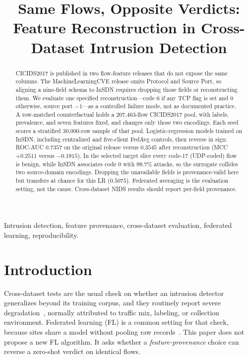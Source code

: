 \documentclass[conference,a4paper]{IEEEtran}
\begin{document}
\title{Same Flows, Opposite Verdicts: Feature Reconstruction in Cross-Dataset Intrusion Detection}
\author{
}
\maketitle
\begin{abstract}
CICIDS2017 is published in two flow-feature releases that do not expose the same columns. The MachineLearningCVE release omits Protocol and Source Port, so aligning a nine-field schema to InSDN requires dropping those fields or reconstructing them. We evaluate one specified reconstruction---code 6 if any TCP flag is set and 0 otherwise, source port $-1$---as a controlled failure mode, not as documented practice. A row-matched counterfactual holds a 207,463-flow CICIDS2017 pool, with labels, prevalence, and seven features fixed, and changes only those two encodings. Each seed scores a stratified 30,000-row sample of that pool. Logistic-regression models trained on InSDN, including centralized and five-client FedAvg controls, then reverse in sign: ROC-AUC $0.7357$ on the original release versus $0.3545$ after reconstruction (MCC $+0.2511$ versus $-0.1915$). In the selected target slice every code-17 (UDP-coded) flow is benign, while InSDN associates code 0 with $99.7\%$ attacks, so the surrogate collides two source-domain encodings. Dropping the unavailable fields is provenance-valid here but transfers at chance for this LR ($0.5075$). Federated averaging is the evaluation setting, not the cause. Cross-dataset NIDS results should report per-field provenance.
\end{abstract}
\begin{IEEEkeywords}Intrusion detection, feature provenance, cross-dataset evaluation, federated learning, reproducibility.\end{IEEEkeywords}

\section{Introduction}
Cross-dataset tests are the usual check on whether an intrusion detector generalizes beyond its training corpus, and they routinely report severe degradation~\cite{dhooge,xenids,layeghy,cantone}, normally attributed to traffic mix, labeling, or collection environment. Federated learning (FL) is a common setting for that check, because sites share a model without pooling raw records~\cite{fedavg,flsurvey}. This paper does not propose a new FL algorithm. It asks whether a \emph{feature-provenance} choice can reverse a zero-shot verdict on identical flows.
\end{document}
